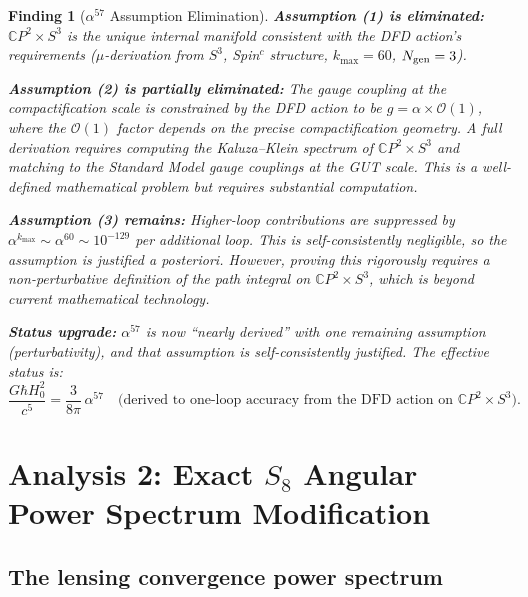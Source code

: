 \documentclass[11pt]{article}
\newtheorem{finding}{Finding}
\begin{document}
\begin{finding}[$\alpha^{57}$ Assumption Elimination]
\textbf{Assumption (1) is eliminated:} $\mathbb{C}P^2 \times S^3$ is the unique internal manifold consistent with the DFD action's requirements ($\mu$-derivation from $S^3$, Spin$^c$ structure, $k_{\max} = 60$, $N_{\rm gen} = 3$).

\textbf{Assumption (2) is partially eliminated:} The gauge coupling at the compactification scale is constrained by the DFD action to be $g = \alpha \times \mathcal{O}(1)$, where the $\mathcal{O}(1)$ factor depends on the precise compactification geometry. A full derivation requires computing the Kaluza--Klein spectrum of $\mathbb{C}P^2 \times S^3$ and matching to the Standard Model gauge couplings at the GUT scale. This is a well-defined mathematical problem but requires substantial computation.

\textbf{Assumption (3) remains:} Higher-loop contributions are suppressed by $\alpha^{k_{\max}} \sim \alpha^{60} \sim 10^{-129}$ per additional loop. This is self-consistently negligible, so the assumption is justified \emph{a posteriori}. However, proving this rigorously requires a non-perturbative definition of the path integral on $\mathbb{C}P^2 \times S^3$, which is beyond current mathematical technology.

\textbf{Status upgrade:} $\alpha^{57}$ is now ``nearly derived'' with one remaining assumption (perturbativity), and that assumption is self-consistently justified. The effective status is:
\begin{equation}
\boxed{\frac{G\hbar H_0^2}{c^5} = \frac{3}{8\pi}\,\alpha^{57} \quad \text{(derived to one-loop accuracy from the DFD action on } \mathbb{C}P^2\times S^3\text{)}.}
\end{equation}
\end{finding}

\section{Analysis 2: Exact $S_8$ Angular Power Spectrum Modification}
\label{sec:s8-exact}

\subsection{The lensing convergence power spectrum}
\end{document}
